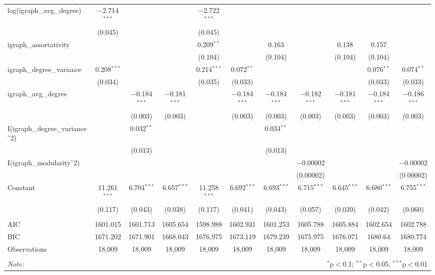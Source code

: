 \begin{table}[!htbp]
\begin{tabular}{@{\extracolsep{5pt}}lcccccccccc}
  log(igraph\_avg\_degree) & $-$2.714$^{***}$ &  &  & $-$2.722$^{***}$ &  &  &  &  &  &  \\ 
  & (0.045) &  &  & (0.045) &  &  &  &  &  &  \\ 
  igraph\_assortativity &  &  &  & 0.209$^{**}$ &  & 0.163 &  & 0.138 & 0.157 &  \\ 
  &  &  &  & (0.104) &  & (0.104) &  & (0.104) & (0.104) &  \\ 
  igraph\_degree\_variance & 0.208$^{***}$ &  &  & 0.214$^{***}$ & 0.072$^{**}$ &  &  &  & 0.076$^{**}$ & 0.074$^{**}$ \\ 
  & (0.034) &  &  & (0.035) & (0.033) &  &  &  & (0.033) & (0.033) \\ 
  igraph\_avg\_degree &  & $-$0.184$^{***}$ & $-$0.181$^{***}$ &  & $-$0.184$^{***}$ & $-$0.184$^{***}$ & $-$0.182$^{***}$ & $-$0.181$^{***}$ & $-$0.184$^{***}$ & $-$0.186$^{***}$ \\ 
  &  & (0.003) & (0.003) &  & (0.003) & (0.003) & (0.003) & (0.003) & (0.003) & (0.003) \\ 
  I(igraph\_degree\_variance$\hat{\mkern6mu}$2) &  & 0.032$^{**}$ &  &  &  & 0.034$^{**}$ &  &  &  &  \\ 
  &  & (0.013) &  &  &  & (0.013) &  &  &  &  \\ 
  I(igraph\_modularity$\hat{\mkern6mu}$2) &  &  &  &  &  &  & $-$0.00002 &  &  & $-$0.00002 \\ 
  &  &  &  &  &  &  & (0.00002) &  &  & (0.00002) \\ 
  Constant & 11.261$^{***}$ & 6.704$^{***}$ & 6.657$^{***}$ & 11.258$^{***}$ & 6.692$^{***}$ & 6.693$^{***}$ & 6.715$^{***}$ & 6.645$^{***}$ & 6.680$^{***}$ & 6.755$^{***}$ \\ 
  & (0.117) & (0.043) & (0.038) & (0.117) & (0.041) & (0.043) & (0.057) & (0.039) & (0.042) & (0.060) \\ 
 \hline \\[-1.8ex] 
AIC & 1601.015 & 1601.713 & 1605.654 & 1598.988 & 1602.931 & 1601.253 & 1605.788 & 1605.884 & 1602.654 & 1602.788 \\ 
BIC & 1671.202 & 1671.901 & 1668.043 & 1676.975 & 1673.119 & 1679.239 & 1675.975 & 1676.071 & 1680.64 & 1680.774 \\ 
Observations & 18,009 & 18,009 & 18,009 & 18,009 & 18,009 & 18,009 & 18,009 & 18,009 & 18,009 & 18,009 \\ 
\hline 
\hline \\[-1.8ex] 
\textit{Note:}  & \multicolumn{10}{r}{$^{*}$p$<$0.1; $^{**}$p$<$0.05; $^{***}$p$<$0.01} \\ 
\end{tabular} 
\end{table} 
